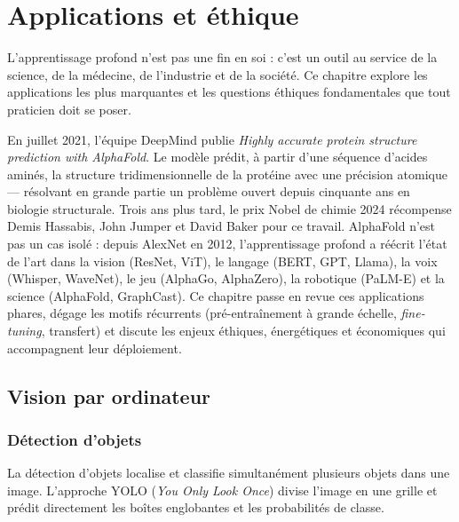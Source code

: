 \chapter{Applications et \'ethique}
\label{ch:applications}

\begin{intuition}
L'apprentissage profond n'est pas une fin en soi : c'est un outil au service de la science, de la m\'edecine, de l'industrie et de la soci\'et\'e. Ce chapitre explore les applications les plus marquantes et les questions \'ethiques fondamentales que tout praticien doit se poser.
\end{intuition}

En juillet 2021, l'équipe DeepMind publie \emph{Highly accurate protein structure prediction with AlphaFold}. Le modèle prédit, à partir d'une séquence d'acides aminés, la structure tridimensionnelle de la protéine avec une précision atomique --- résolvant en grande partie un problème ouvert depuis cinquante ans en biologie structurale. Trois ans plus tard, le prix Nobel de chimie 2024 récompense Demis Hassabis, John Jumper et David Baker pour ce travail. AlphaFold n'est pas un cas isolé : depuis AlexNet en 2012, l'apprentissage profond a réécrit l'état de l'art dans la vision (ResNet, ViT), le langage (BERT, GPT, Llama), la voix (Whisper, WaveNet), le jeu (AlphaGo, AlphaZero), la robotique (PaLM-E) et la science (AlphaFold, GraphCast). Ce chapitre passe en revue ces applications phares, dégage les motifs récurrents (pré-entraînement à grande échelle, \emph{fine-tuning}, transfert) et discute les enjeux éthiques, énergétiques et économiques qui accompagnent leur déploiement.

\section{Vision par ordinateur}
\label{sec:app_vision}

\subsection{D\'etection d'objets}

La d\'etection d'objets localise et classifie simultan\'ement plusieurs objets dans une image. L'approche YOLO (\emph{You Only Look Once}) divise l'image en une grille et pr\'edit directement les bo\^ites englobantes et les probabilit\'es de classe.

